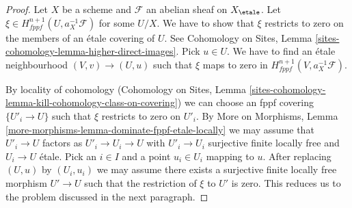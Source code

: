 \begin{proof}
Let $X$ be a scheme and $\mathcal{F}$ an abelian sheaf on $X_\etale$.
Let $\xi \in H^{n + 1}_{fppf}(U, a_X^{-1}\mathcal{F})$ for some $U/X$.
We have to show that $\xi$ restricts to zero on the members of an
\'etale covering of $U$. See Cohomology on Sites,
Lemma \ref{sites-cohomology-lemma-higher-direct-images}.
Pick $u \in U$. We have to find an \'etale neighbourhood
$(V, v) \to (U, u)$
such that $\xi$ maps to zero in $H^{n + 1}_{fppf}(V, a_X^{-1}\mathcal{F})$.

\medskip\noindent
By locality of cohomology (Cohomology on Sites, Lemma
\ref{sites-cohomology-lemma-kill-cohomology-class-on-covering})
we can choose an fppf covering $\{U'_i \to U\}$
such that $\xi$ restricts to zero on $U'_i$.
By More on Morphisms, Lemma
\ref{more-morphisms-lemma-dominate-fppf-etale-locally}
we may assume that $U'_i \to U$ factors as $U'_i \to U_i \to U$
with $U'_i \to U_i$ surjective finite locally free and
$U_i \to U$ \'etale.
Pick an $i \in I$ and a point $u_i \in U_i$ mapping to $u$.
After replacing $(U, u)$ by $(U_i, u_i)$ we may assume there exists
a surjective finite locally free morphism $U' \to U$ such that
the restriction of $\xi$ to $U'$ is zero. This reduces us to the
problem discussed in the next paragraph.


\end{proof}
